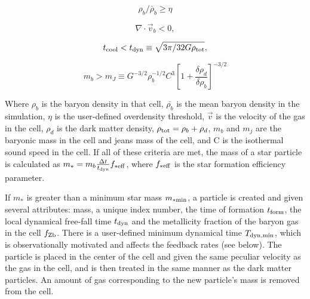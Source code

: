\begin{equation}
\rho_b/\bar{\rho}_b \geq \eta
\label{cendens}
\end{equation} 

\begin{equation}
\nabla \cdot \vec{v}_b < 0,
\label{cencont}
\end{equation}

\begin{equation}
t_{\rm cool} < t_{\rm dyn} \equiv \sqrt{3 \pi / 32G \rho_{\rm tot}},
\end{equation}

\begin{equation}
m_{b} > m_{J} \equiv G^{-3/2} \rho_{b}^{-1/2}C^{3}
\left[ 1 + \frac{\delta\rho_{d}}{\delta\rho_{b}} \right]^{-3/2}
\end{equation}

Where $\rho_b$ is the baryon density in that cell, $\bar{\rho_b}$ is
the mean baryon density in the simulation, $\eta$ is the user-defined
overdensity threshold, $\vec{v}$ is the velocity of the gas in the
cell, $\rho_{d}$ is the dark matter density, $\rho_{\rm tot} =
\rho_{b} + \rho_{d}$, $m_{b}$ and $m_{j}$ are the baryonic mass in the
cell and jeans mass of the cell, and C is the isothermal sound speed
in the cell.  If all of these criteria are met, the mass of a star
particle is calculated as \(m_{*} = m_{b} \frac{ \Delta t}{ t_{\rm
    dyn} } f_{\rm *eff} \), where $f_{\rm *eff}$ is the star formation
efficiency parameter.

If $m_{*}$ is greater than a minimum star mass $m_{\rm *min}$, a particle
is created and given several attributes: mass, a unique index number,
the time of formation $t_{\rm form}$, the local dynamical free-fall time
$t_{\rm dyn}$ and the metallicity fraction of the baryon gas in the cell
$f_{\rm Zb}$.  There is a user-defined minimum dynamical time
$T_{\rm dyn,min}$, which is observationally motivated and affects the
feedback rates (see below).  The particle is placed in the center of
the cell and given the same peculiar velocity as the gas in the cell,
and is then treated in the same manner as the dark matter particles.
An amount of gas corresponding to the new particle's mass is
removed from the cell.


